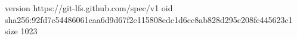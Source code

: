 version https://git-lfs.github.com/spec/v1
oid sha256:92fd7c54486061caa6d9d67f2e115808edc1d6cc8ab828d295c208fc445623c1
size 1023
